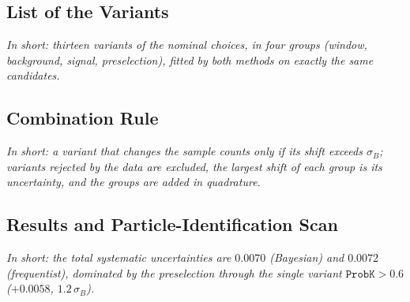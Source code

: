 \begin{table}[t]
\caption{All fits of the nominal model and of its variants: number of candidates, Bayesian posterior median and 68\% credible interval of $\Araw$, binned goodness of fit ($10\,\MeV$ bins), and frequentist estimate with its Hesse uncertainty (Sec.~\ref{sec:frequentist}; fitted on the same candidates; the cross-checks of the Bayesian fits that have no frequentist counterpart in this work are marked --). $^\dagger$ Uncertainty scaled from the number of events, since the Hesse matrix of that fit is not accurate. Every fit uses 32 walkers and $25{,}000$ steps.}
\label{tab:bayes_all}
\end{table}

\subsection{List of the Variants}
\emph{In short: thirteen variants of the nominal choices, in four groups (window, background, signal, preselection), fitted by both methods on exactly the same candidates.}

\subsection{Combination Rule}
\emph{In short: a variant that changes the sample counts only if its shift exceeds $\sigma_B$; variants rejected by the data are excluded, the largest shift of each group is its uncertainty, and the groups are added in quadrature.}

\subsection{Results and Particle-Identification Scan}
\emph{In short: the total systematic uncertainties are $0.0070$ (Bayesian) and $0.0072$ (frequentist), dominated by the preselection through the single variant $\texttt{ProbK}>0.6$ ($+0.0058$, $1.2\,\sigma_B$).}

